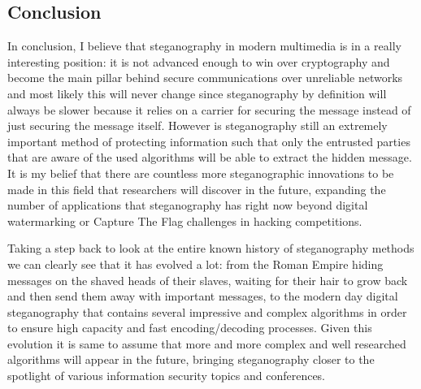 \documentclass[notitlepage]{report}
\begin{document}
\clearpage
\begin{multicols*}{2}
\chapter{Conclusion}
In conclusion, I believe that steganography in modern multimedia is in a really interesting position: it is not advanced enough to win over cryptography and become the main pillar behind secure communications over unreliable networks and most likely this will never change since steganography by definition will always be slower because it relies on a carrier for securing the message instead of just securing the message itself. However is steganography still an extremely important method of protecting information such that only the entrusted parties that are aware of the used algorithms will be able to extract the hidden message. It is my belief that there are countless more steganographic innovations to be made in this field that researchers will discover in the future, expanding the number of applications that steganography has right now beyond digital watermarking or Capture The Flag challenges in hacking competitions. 

Taking a step back to look at the entire known history of steganography methods we can clearly see that it has evolved a lot: from the Roman Empire hiding messages on the shaved heads of their slaves, waiting for their hair to grow back and then send them away with important messages, to the modern day digital steganography that contains several impressive and complex algorithms in order to ensure high capacity and fast encoding/decoding processes. Given this evolution it is same to assume that more and more complex and well researched algorithms will appear in the future, bringing steganography closer to the spotlight of various information security topics and conferences.
\end{multicols*}


  

\end{document}
